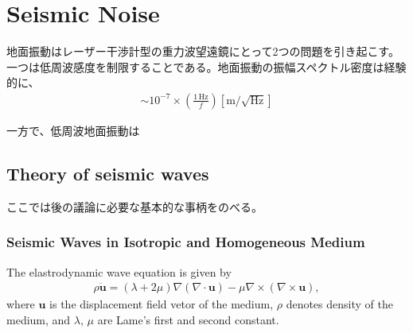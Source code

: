 \chapter{Seismic Noise}
地面振動はレーザー干渉計型の重力波望遠鏡にとって2つの問題を引き起こす。一つは低周波感度を制限することである。地面振動の振幅スペクトル密度は経験的に、
\begin{eqnarray}\label{eq:eq_0}
  \sim 10^{-7}\times\left(\frac{1\,\mathrm{Hz}}{f}\right) [\mathrm{m}/\sqrt{\mathrm{Hz}}]
\end{eqnarray}


一方で、低周波地面振動は


\section{Theory of seismic waves}
ここでは後の議論に必要な基本的な事柄をのべる。

\subsection{Seismic Waves in Isotropic and Homogeneous Medium}
The elastrodynamic wave equation is given by 
\begin{eqnarray}\label{eq:eq_1}
  \rho{\bm{\ddot{u}}} = (\lambda+2\mu)\nabla(\nabla\cdot\bm{u}) - \mu\nabla\times(\nabla\times\bm{u}),
\end{eqnarray}
where $\bm{u}$ is the displacement field vetor of the medium, $\rho$ denotes density of the medium, and $\lambda,\,\mu$ are Lame's first and second constant.

